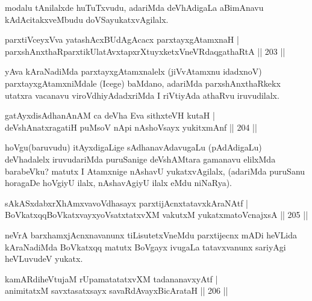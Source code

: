 
\begin{artha}
modalu tAnilalxde huTuTxvudu, adariMda deVhAdigaLa aBimAnavu kAdAcitakxveMbudu doVSayukatxvAgilalx.
\end{artha}

\begin{shl}
parxtiVceyxVva yatashAcxBUdAgAcacx parxtayxgAtamxnaH |\\
parxshAnxthaRparxtikUlatAvxtapxrXtuyxketxVneVRdaqgathaRtA \hfill || 203 ||
\end{shl}

\begin{artha}
yAva kAraNadiMda parxtayxgAtamxnalelx (jiVvAtamxnu idadxnoV) parxtayxgAtamxniMdale (Icege) baMdano, adariMda parxshAnxthaRkekx utatxra vacanavu viroVdhiyAdadxriMda I riVtiyAda athaRvu iruvudilalx.
\end{artha}

\begin{shl}
gatAyxdisAdhanAnAM ca deVha Eva sithxteVH kutaH |\\
deVshAnatxragatiH puMsoV nApi nAshoV\s sayx yukitxmAnf \hfill || 204 ||
\end{shl}

\begin{artha}
hoVgu(baruvudu) itAyxdigaLige sAdhanavAdavugaLu (pAdAdigaLu) deVhadalelx iruvudariMda puruSanige deVshAMtara gamanavu elilxMda barabeVku? matutx I Atamxnige nAshavU yukatxvAgilalx, (adariMda puruSanu horagaDe hoVgiyU ilalx, nAshavAgiyU ilalx eMdu niNaRya).
\end{artha}


\begin{shl}
sAkASxdabxrXhAmxvavoVdhasayx parxtijAcnxtatavxkAraNAtf |\\
BoVkatxqqBoVkatxvayxyoVsatxtatxvXM vakutxM yukatxmatoV\s cnajxsA \hfill || 205 ||
\end{shl}

\begin{artha}
neVrA barxhamxjAcnxnavanunx tiLisutetxVneMdu parxtijecnx mADi heVLida kAraNadiMda BoVkatxqq matutx BoVgayx ivugaLa tatavxvanunx sariyAgi heVLuvudeV yukatx.
\end{artha}


\begin{shl}
kamARdiheVtujaM rUpamatatatxvXM tadananavxyAtf |\\
animitatxM savxtasatxsayx savaRdA\s vayxBicArataH \hfill || 206 ||
\end{shl}

